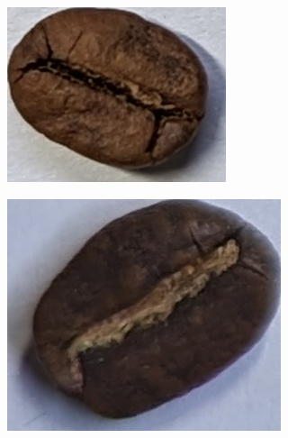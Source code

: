 \begin{figure}
	{\textwidth}
	\begin{subfigure}
		{0.3\textwidth}
		\includegraphics[height=0.8\linewidth, keepaspectratio]{
			./figures/methodology/quaker-bean
		}
		 \label{fig:quakerBeanSingle}
	\end{subfigure}
	\begin{subfigure}
		{0.3\textwidth}
		\includegraphics[height=0.8\linewidth, keepaspectratio]{
			./figures/methodology/normal-bean
		}
		 \label{fig:normalBeanSingle}
	\end{subfigure}

\end{figure}
